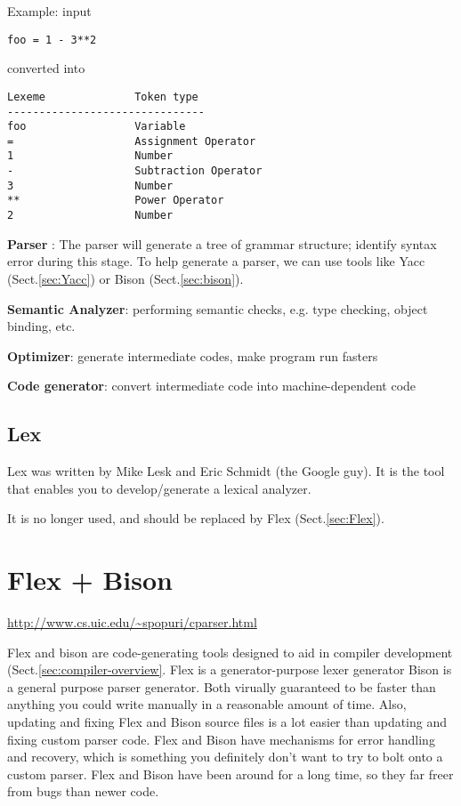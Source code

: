 Example: input
\begin{verbatim}
foo = 1 - 3**2
\end{verbatim}
converted into
\begin{verbatim}
Lexeme              Token type
-------------------------------
foo                 Variable
=                   Assignment Operator
1                   Number
-                   Subtraction Operator
3                   Number
**                  Power Operator
2                   Number
\end{verbatim}


{\bf Parser }: The parser will generate a tree of grammar structure; 
identify syntax error during this stage. To help generate a parser, we can use
tools like Yacc (Sect.\ref{sec:Yacc}) or Bison (Sect.\ref{sec:bison}).

{\bf Semantic Analyzer}:  performing semantic checks, e.g. type checking, object
binding, etc. 

{\bf Optimizer}: generate intermediate codes, make program run fasters


{\bf Code generator}: convert intermediate code into machine-dependent code

\section{Lex}
\label{sec:Lex}

Lex was written by Mike Lesk and Eric Schmidt
(the Google guy). It is the tool that enables you to develop/generate a lexical
analyzer. 

It is no longer used, and should be replaced by Flex (Sect.\ref{sec:Flex}).


\chapter{Flex + Bison}
\label{chap:Bison}
\label{chap:Flex}

\url{http://www.cs.uic.edu/~spopuri/cparser.html}

Flex and bison are code-generating tools designed to aid in compiler development
(Sect.\ref{sec:compiler-overview}. Flex is a generator-purpose lexer generator
Bison is a general purpose parser generator. Both virually guaranteed to be
faster than anything you could write manually in a reasonable amount of time.
Also, updating and fixing Flex and Bison source files is a lot easier than
updating and fixing custom parser code. Flex and Bison have mechanisms for error
handling and recovery, which is something you definitely don't want to try to
bolt onto a custom parser. Flex and Bison have been around for a long time, so
they far freer from bugs than newer code.

